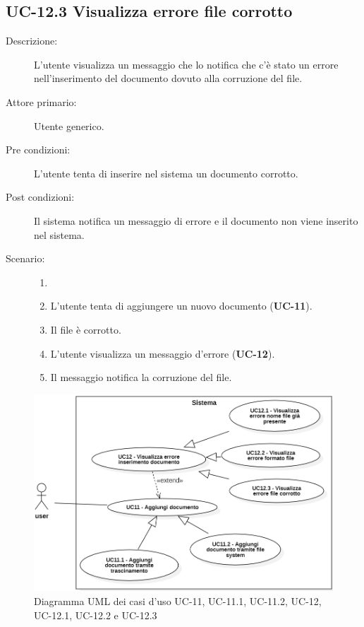 \subsection{UC-12.3 Visualizza errore file corrotto}
\begin{description}
    \item[Descrizione:] L'utente visualizza un messaggio che lo notifica che c'è stato un errore nell'inserimento del documento dovuto alla corruzione del file.
    \item[Attore primario:] Utente generico.
    \item[Pre condizioni:] L'utente tenta di inserire nel sistema un documento corrotto.
    \item[Post condizioni:] Il sistema notifica un messaggio di errore e il documento non viene inserito nel sistema.
    \item[Scenario:]
    \begin{enumerate}
        \item[]
        \item L’utente tenta di aggiungere un nuovo documento (\textbf{UC-11}).
        \item Il file è corrotto.
        \item L'utente visualizza un messaggio d'errore (\textbf{UC-12}).
        \item Il messaggio notifica la corruzione del file.
    \end{enumerate}
\end{description}

\begin{figure}[H]
    \centering
    \includegraphics[width=\linewidth]{UC11.PNG}
    \caption{Diagramma UML dei casi d'uso UC-11, UC-11.1, UC-11.2, UC-12, UC-12.1, UC-12.2 e UC-12.3}
    \label{fig:UC12-13}
\end{figure}

